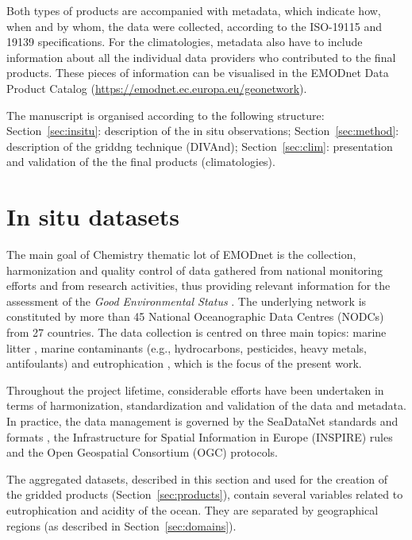 \documentclass[essd, manuscript]{copernicus}
\begin{document}
Both types of products are accompanied with metadata, which indicate how, when and by whom, the data were collected, according to the ISO-19115 and 19139 specifications. For the climatologies, metadata also have to include information about all the individual data providers who contributed to the final products. These pieces of information can be visualised in the EMODnet Data Product Catalog (\url{https://emodnet.ec.europa.eu/geonetwork}).

The manuscript is organised according to the following structure: Section~\ref{sec:insitu}: description of the in situ observations; Section~\ref{sec:method}: description of the griddng technique (DIVAnd); Section~\ref{sec:clim}: presentation and validation of the the final products (climatologies). 


\section{In situ datasets\label{sec:insitu}}

The main goal of Chemistry thematic lot of EMODnet is the collection, harmonization and quality control of data gathered from national monitoring efforts and from research activities, thus providing relevant information for the assessment of the \textit{Good Environmental Status} \citep[GES,][]{Vinci2017}. The underlying network is constituted by more than 45 National Oceanographic Data Centres (NODCs) from 27 countries. The data collection is centred on three main topics: marine litter \citep{Vinci2018}, marine contaminants (e.g., hydrocarbons, pesticides, heavy metals, antifoulants) and eutrophication \citep{Giorgetti2020}, which is the focus of the present work. 

Throughout the project lifetime, considerable efforts have been undertaken in terms of harmonization, standardization and validation of the data and metadata. In practice, the data management is governed by the SeaDataNet standards and formats \citep{Schaap2010}, the Infrastructure for Spatial Information in Europe (INSPIRE) rules and the Open Geospatial Consortium (OGC) protocols. 

The aggregated datasets, described in this section and used for the creation of the gridded products (Section~\ref{sec:products}), contain several variables related to eutrophication and acidity of the ocean. They are separated by geographical regions (as described in Section~\ref{sec:domains}).
\end{document}
